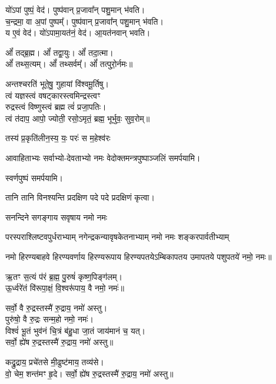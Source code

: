 \begin{center}
यो॑ऽपां पुष्पं॒ वेद॑। पुष्प॑वान् प्र॒जावा᳚न् पशु॒मान् भ॑वति।\\
च॒न्द्रमा॒ वा अ॒पां पुष्पम्᳚। पुष्प॑वान् प्र॒जावा᳚न् पशु॒मान् भ॑वति।\\
य ए॒वं वेद॑। यो॑ऽपामा॒यत॑नं॒ वेद॑। आ॒यत॑नवान् भवति।\medskip

ओं᳚ तद्ब्र॒ह्म। ओं᳚ तद्वा॒युः। ओं᳚ तदा॒त्मा।\\ ओं᳚ तथ्स॒त्यम्‌।
ओं᳚ तथ्सर्वम्᳚‌। ओं᳚ तत्पुरो॒र्नमः॥\medskip

अन्तश्चरति॑ भूते॒षु॒ गुहायां वि॑श्वमू॒र्तिषु। \\
त्वं यज्ञस्त्वं वषट्कारस्त्वमिन्द्रस्त्वꣳ\\ रुद्रस्त्वं विष्णुस्त्वं ब्रह्म त्वं॑ प्रजा॒पतिः। \\
त्वं त॑दाप॒ आपो॒ ज्योती॒ रसो॒ऽमृतं॒ ब्रह्म॒ भूर्भुवः॒ सुव॒रोम्‌॥\medskip

{तस्य॑ प्र॒कृति॑लीन॒स्य॒ यः॒ परः॑ स म॒हेश्व॑रः}
\medskip

आवाहिताभ्यः सर्वाभ्यो-देवताभ्यो नमः वेदोक्तमन्त्रपुष्पाञ्जलिं समर्पयामि।\medskip

स्वर्णपुष्पं समर्पयामि।\medskip


{तानि तानि विनश्यन्ति प्रदक्षिण पदे पदे}
प्रदक्षिणं कृत्वा।\medskip

{सनन्दिने सगङ्गाय सवृषाय नमो नमः}

{परस्पराश्लिष्टवपुर्धराभ्याम्‌}
{नगेन्द्रकन्यावृषकेतनाभ्याम्‌}
{नमो नमः शङ्करपार्वतीभ्याम्‌}%

नमो हिरण्यबाहवे हिरण्यवर्णाय हिरण्यरूपाय हिरण्यपतये\-ऽम्बिकापतय उमापतये पशुपतये॑ नमो॒ नमः॥%

ऋ॒तꣳ स॒त्यं प॑रं ब्र॒ह्म॒ पु॒रुषं॑ कृष्ण॒पिङ्ग॑लम्।\\ 
ऊ॒र्ध्वरे॑तं वि॑रूपा॒क्षं॒ वि॒श्वरू॑पाय॒ वै नमो॒ नमः॑॥%

सर्वो॒ वै रु॒द्रस्तस्मै॑ रु॒द्राय॒ नमो॑ अस्तु।\\ 
पुरु॑षो॒ वै रु॒द्रः सन्म॒हो नमो॒ नमः॑।\\
विश्वं॑ भू॒तं भुव॑नं चि॒त्रं ब॑हु॒धा जा॒तं जाय॑मानं च॒ यत्।\\
सर्वो॒ ह्ये॑ष रु॒द्रस्तस्मै॑ रु॒द्राय॒ नमो॑ अस्तु॥%


कद्रु॒द्राय॒ प्रचे॑तसे मी॒ढुष्ट॑माय॒ तव्य॑से।\\ 
वो॒ चेम॒ शन्त॑मꣳ हृ॒दे। 
सर्वो॒ ह्ये॑ष रु॒द्रस्तस्मै॑ रु॒द्राय॒ नमो॑ अस्तु॥%



\end{center}

